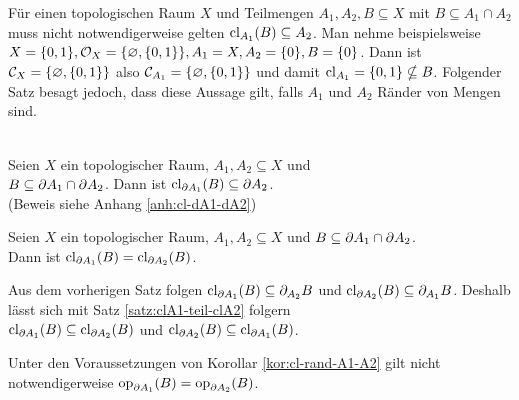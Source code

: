     Für einen topologischen Raum $X$ und Teilmengen $A_1, A_2, B \subseteq X$ mit $B \subseteq A_1 \cap A_2$ muss nicht notwendigerweise gelten $\text{cl}_{A_1}(B) \subseteq A_2$. 
    Man nehme beispielsweise $X = \{0,1\}, \mathcal{O}_X = \{\varnothing, \{0,1\}\}, A_1 = X, A_2 = \{0\}, B = \{0\}$. Dann ist $\mathcal{C}_X = \{\varnothing, \{0,1\}\}$ also $\mathcal{C}_{A_1} = \{\varnothing, \{0,1\}\}$ und damit $\text{cl}_{A_1} = \{0,1\} \nsubseteq B$.
    Folgender Satz besagt jedoch, dass diese Aussage gilt, falls $A_1$ und $A_2$ Ränder von Mengen sind.
    \begin{satz}\label{satz:cl-dA1-dA2}\ \\
        Seien $X$ ein topologischer Raum, $A_1, A_2 \subseteq X$ und \\
        $B \subseteq \partial A_1 \cap \partial A_2$.
        Dann ist $\text{cl}_{\partial A_1}(B) \subseteq \partial A_2$.\\
        (Beweis siehe Anhang \ref{anh:cl-dA1-dA2})
    \end{satz}


    \begin{kor}\label{kor:cl-rand-A1-A2}
        Seien $X$ ein topologischer Raum, $A_1, A_2 \subseteq X$ und $B \subseteq \partial A_1 \cap \partial A_2$.\\
        Dann ist ${\text{cl}_{\partial A_1}(B) = \text{cl}_{\partial A_2}(B)}$.
    \end{kor}
    \begin{bew}
        Aus dem vorherigen Satz folgen $\text{cl}_{\partial A_1}(B) \subseteq \partial_{A_2}B$ und $\text{cl}_{\partial A_2}(B) \subseteq \partial_{A_1}B$. Deshalb lässt sich mit Satz \ref{satz:clA1-teil-clA2} folgern \\
        ${\text{cl}_{\partial A_1}(B) \subseteq \text{cl}_{\partial A_2}(B)}$ und ${\text{cl}_{\partial A_2}(B) \subseteq \text{cl}_{\partial A_1}(B)}$.
    \end{bew}

    Unter den Voraussetzungen von Korollar \ref{kor:cl-rand-A1-A2} gilt nicht notwendigerweise ${\text{op}_{\partial A_1}(B) = \text{op}_{\partial A_2}(B)}$.
    
